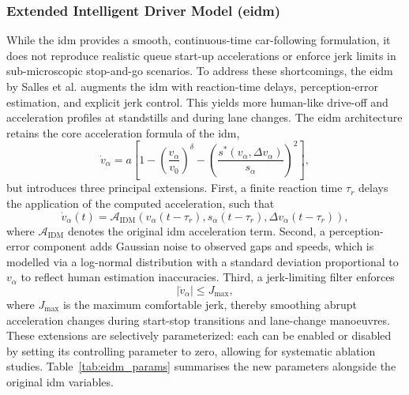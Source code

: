 \subsubsection{Extended Intelligent Driver Model (\acs{eidm})}
\label{subsubsec:eidm}
While the \ac{idm} provides a smooth, continuous-time car-following formulation, it does not reproduce realistic queue start-up accelerations or enforce jerk limits in sub-microscopic stop-and-go scenarios. \cite{Treiber_2000} To address these shortcomings, the \acf{eidm} by Salles et al. augments the \ac{idm} with reaction-time delays, perception-error estimation, and explicit jerk control. This yields more human-like drive-off and acceleration profiles at standstills and during lane changes. \cite{Salles2022}
\mynewline
The \ac{eidm} architecture retains the core acceleration formula of the \ac{idm},
\begin{equation}
    \dot{v}_\alpha = a\left[1 - \left(\frac{v_\alpha}{v_0}\right)^\delta - \left(\frac{s^*(v_\alpha,\Delta v_\alpha)}{s_\alpha}\right)^2\right],
\end{equation}
but introduces three principal extensions. First, a finite reaction time $\tau_r$ delays the application of the computed acceleration, such that
\begin{equation}
    \dot{v}_\alpha(t) = \mathcal{A}_\text{IDM}\left(v_\alpha(t-\tau_r), s_\alpha(t-\tau_r), \Delta v_\alpha(t-\tau_r)\right),
\end{equation}
where $\mathcal{A}_\text{IDM}$ denotes the original \ac{idm} acceleration term. Second, a perception-error component adds Gaussian noise to observed gaps and speeds, which is modelled via a log-normal distribution with a standard deviation proportional to $v_\alpha$ to reflect human estimation inaccuracies. Third, a jerk-limiting filter enforces
\begin{equation}
    |\ddot{v}_\alpha| \leq J_\text{max},
\end{equation}
where $J_\text{max}$ is the maximum comfortable jerk, thereby smoothing abrupt acceleration changes during start-stop transitions and lane-change manoeuvres.
\mynewline
These extensions are selectively parameterized: each can be enabled or disabled by setting its controlling parameter to zero, allowing for systematic ablation studies. Table~\ref{tab:eidm_params} summarises the new parameters alongside the original \ac{idm} variables.

